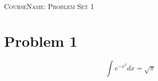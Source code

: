 \documentclass[12pt]{article}
\newcommand{\coursename}{CourseName}
\newcommand{\exerciseset}{Problem Set 1}
\begin{document}
\begin{center}
\huge
\textsc{\coursename : \exerciseset}
\end{center}


\section*{Problem 1}

$$
\int e^{-x^2} dx = \sqrt{\pi}
$$

\renewcommand{\mkbibnamefamily}[1]{\textsc{#1}}
\printbibliography

\appendix
\end{document}
